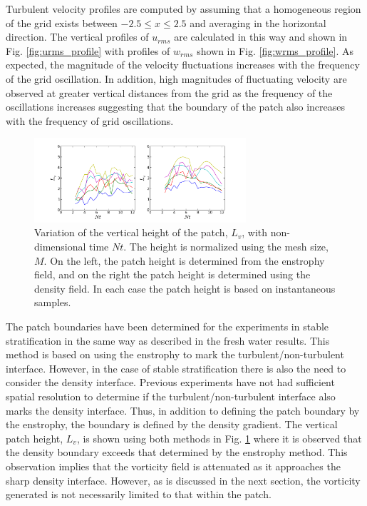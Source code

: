 \documentclass{piv13-abstract}
\newcommand{\figLabel}{Fig. }
\begin{document}
Turbulent velocity profiles are computed by assuming that a homogeneous region of the grid exists between $-2.5 \le x \le 2.5$ and averaging in the horizontal direction. The vertical profiles of $u_{rms}$ are calculated in this way and shown in \figLabel\ref{fig:urms_profile} with profiles of $w_{rms}$ shown in \figLabel\ref{fig:wrms_profile}. As expected, the magnitude of the velocity fluctuations increases with the frequency of the grid oscillation. In addition, high magnitudes of fluctuating velocity are observed at greater vertical distances from the grid as the frequency of the oscillations increases suggesting that the boundary of the patch also increases with the frequency of grid oscillations.

\begin{figure}[h]
\centering
\includegraphics[width=0.7\textwidth]{figures/plifBoundaries.pdf}
\caption{Variation of the vertical height of the patch, $L_v$, with non-dimensional time $Nt$. The height is normalized using the mesh size, $M$. On the left, the patch height is determined from the enstrophy field, and on the right the patch height is determined using the density field. In each case the patch height is based on instantaneous samples.  \label{fig:plifBoundaries}}
\end{figure}

The patch boundaries have been determined for the experiments in stable stratification in the same way as described in the fresh water results. This method is based on using the enstrophy to mark the turbulent/non-turbulent interface. However, in the case of stable stratification there is also the need to consider the density interface. Previous experiments have not had sufficient spatial resolution to determine if the turbulent/non-turbulent interface also marks the density interface. Thus, in addition to defining the patch boundary by the enstrophy, the boundary is defined by the density gradient. The vertical patch height, $L_v$, is shown using both methods in \figLabel\ref{fig:plifBoundaries} where it is observed that the density boundary exceeds that determined by the enstrophy method. This observation implies that the vorticity field is attenuated as it approaches the sharp density interface. However, as is discussed in the next section, the vorticity generated is not necessarily limited to that within the patch.
\end{document}
